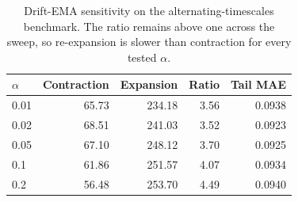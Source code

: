 \begin{table}[!htbp]
\centering
\caption{Drift-EMA sensitivity on the alternating-timescales benchmark. The ratio remains above one across the sweep, so re-expansion is slower than contraction for every tested $\alpha$.}
\label{tab:zeta_sweep}
\begin{tabular}{lrrrr}
\toprule
$\alpha$ & Contraction & Expansion & Ratio & Tail MAE \\
\midrule
0.01 & 65.73 & 234.18 & 3.56 & 0.0938 \\
0.02 & 68.51 & 241.03 & 3.52 & 0.0923 \\
0.05 & 67.10 & 248.12 & 3.70 & 0.0925 \\
0.1 & 61.86 & 251.57 & 4.07 & 0.0934 \\
0.2 & 56.48 & 253.70 & 4.49 & 0.0940 \\
\bottomrule
\end{tabular}
\end{table}
